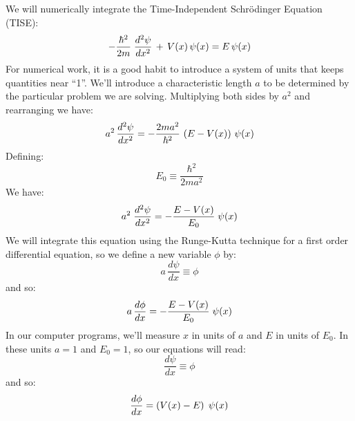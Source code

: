\documentclass[12pt]{book}
\begin{document}
We will numerically integrate the Time-Independent Schr\"odinger Equation (TISE):
\begin{equation}
- \frac{\hbar^2}{2 m} \;  \frac{d^2 \psi}{dx^2}  \, + \, V(x) \, \psi(x) = E \, \psi(x)\\
\end{equation}
For numerical work, it is a good habit to introduce a system of units that keeps quantities near ``1''.  We'll introduce a characteristic length $a$ to be determined by the particular problem we are solving.  Multiplying both sides by $a^2$ and rearranging we have:
\begin{equation}
a^2 \,  \frac{d^2 \psi}{dx^2}  = - \frac{2ma^2}{\hbar^2}\,\left(E - V(x)\right) \, \psi(x)\\
\end{equation}
Defining:
\begin{equation}
E_0 \equiv \frac{\hbar^2}{2ma^2}
\end{equation}
We have:
\begin{equation}
a^2 \;  \frac{d^2 \psi}{dx^2}  = - \frac{E - V(x)}{E_0} \; \psi(x)\\
\end{equation}
We will integrate this equation using the Runge-Kutta technique for a first order differential equation, so we define a new variable $\phi$ by:
\begin{equation}
a \, \frac{d\psi}{dx} \equiv \phi
\end{equation}
and so:
\begin{equation}
a \, \frac{d\phi}{dx} = - \frac{E - V(x)}{E_0} \; \psi(x)\\
\end{equation}
In our computer programs, we'll measure $x$ in units of $a$ and $E$ in units of $E_0$.  In these units $a=1$ and $E_0=1$, so our equations will read:
\begin{equation}
\frac{d\psi}{dx} \equiv \phi
\end{equation}
and so:
\begin{equation}
\frac{d\phi}{dx} = \left( V(x) - E \right) \; \psi(x)\\
\end{equation}
\end{document}
